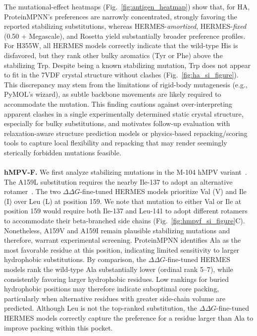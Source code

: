     
The mutational-effect heatmaps (Fig.~\ref{fig:antigen_heatmap}) show that, for HA, ProteinMPNN's
preferences are narrowly concentrated, strongly favoring the reported stabilizing substitutions,
whereas HERMES-\textit{amortized}, HERMES-\textit{fixed} (0.50 + Megascale), and Rosetta yield
substantially broader preference profiles. For H355W, all HERMES models correctly indicate that the
wild-type His is disfavored, but they rank other bulky aromatics (Tyr or Phe) above the stabilizing
Trp.
 Despite being a known stabilizing mutation, Trp does not appear to fit in the 7VDF crystal
 structure without clashes (Fig.~\ref{fig:ha_si_figure}). This discrepancy may stem from the
 limitations of rigid-body mutagenesis (e.g., PyMOL's wizard), as subtle backbone movements are
 likely required to accommodate the mutation. This finding cautions against over-interpreting
 apparent clashes in a single experimentally determined static crystal structure, especially for
 bulky substitutions, and motivates follow-up evaluation with relaxation-aware structure prediction
 models or physics-based repacking/scoring tools to capture local flexibility and repacking that may
 render seemingly sterically forbidden mutations feasible.\\\\
\noindent \textbf{hMPV-F.} 
We first analyze stabilizing mutations in the M-104 hMPV variant~\citep{gonzalez_general_2024}.
The A159L substitution requires the nearby Ile-137 to adopt an alternative
rotamer~\citep{gonzalez_general_2024}. The two $\Delta\Delta G$-fine-tuned HERMES models prioritize
Val (V) and Ile (I) over Leu (L) at position 159. We note that mutation to either Val or Ile at
position 159 would require both Ile-137 and Leu-141 to adopt different rotamers to accommodate their
beta-branched side chains (Fig.~\ref{fig:hmpvf_si_figure}C). Nonetheless, A159V and A159I remain
plausible stabilizing mutations and therefore, warrant experimental screening.
ProteinMPNN identifies Ala as the most favorable residue at this position, indicating limited
sensitivity to larger hydrophobic substitutions. By comparison, the $\Delta\Delta G$-fine-tuned
HERMES models rank the wild-type Ala substantially lower (ordinal rank 5--7), while consistently
favoring larger hydrophobic residues. Low rankings for buried hydrophobic positions may therefore
indicate suboptimal core packing, particularly when alternative residues with greater side-chain
volume are predicted. Although Leu is not the top-ranked substitution, the $\Delta\Delta
G$-fine-tuned HERMES models correctly capture the preference for a residue larger than Ala to
improve packing within this pocket.

